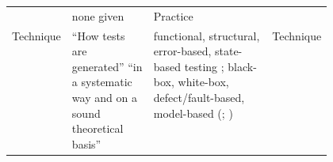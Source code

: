 \begin{table}[hbtp!]
\begin{tabularx}{\linewidth}{|c|X|m{0.37\linewidth}|m{0.1\linewidth}|}
        \cite[p.~3]{BarbosaEtAl2006}    & none given         & Practice                                 \\
        Technique                       & ``How tests are
        generated'' \cite[p.~ 88]{SWEBOK2014} ``in a systematic way and on a sound theoretical basis''
        \cite[p.~3]{BarbosaEtAl2006}    & functional,
        structural, error-based, state-based testing \cite[p.~3]{BarbosaEtAl2006};
        black-box, white-box, defect/fault-based, model-based
        (\citealp[p.~3]{SouzaEtAl2017}; \citealp[pp.~88, 90-91]{SWEBOK2014})
                                        & Technique                                                     \\
        \hline
    \end{tabularx}
\end{table}

